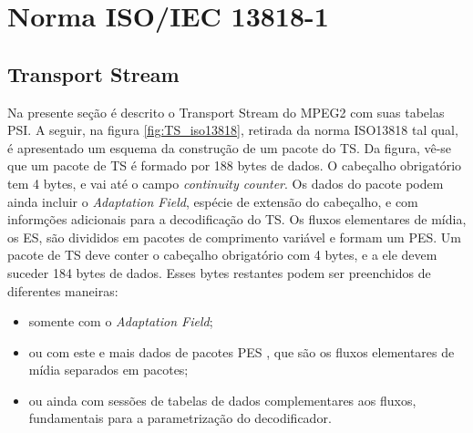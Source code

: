 \documentclass[
	12pt,				%
	openright,			%
	twoside,			%
	a4paper,			%
	brazil,
	french,				%
	english
	]{abntex2}
\begin{document}

\chapter{Norma ISO/IEC 13818-1}

\section{Transport Stream}

Na presente seção é descrito o Transport Stream do MPEG2 com suas tabelas PSI. A seguir, na figura
\ref{fig:TS_iso13818}, retirada da norma ISO13818 tal qual, é apresentado um esquema da construção de
um pacote do TS. Da figura, vê-se que um pacote de TS é formado por 188 bytes de dados. O cabeçalho
obrigatório tem 4 bytes, e vai até o campo \textit{continuity counter}. Os dados do pacote podem ainda
incluir o \textit{Adaptation Field}, espécie de extensão do cabeçalho, e com informções adicionais para
a decodificação do TS. Os fluxos elementares de mídia, os ES, são divididos em pacotes de comprimento variável e formam um PES. Um pacote de TS deve conter o cabeçalho obrigatório com 4 bytes, e a ele devem suceder 184 bytes de dados. Esses bytes restantes podem ser preenchidos de diferentes maneiras:

\begin{itemize}

\item{ somente com o \textit{Adaptation Field};}

\item{ ou com este e mais dados de pacotes PES , que são os fluxos elementares de mídia separados em pacotes;}

\item{ou ainda com sessões de tabelas de dados complementares aos fluxos, fundamentais para a parametrização do decodificador.}

\end{itemize}
\end{document}
